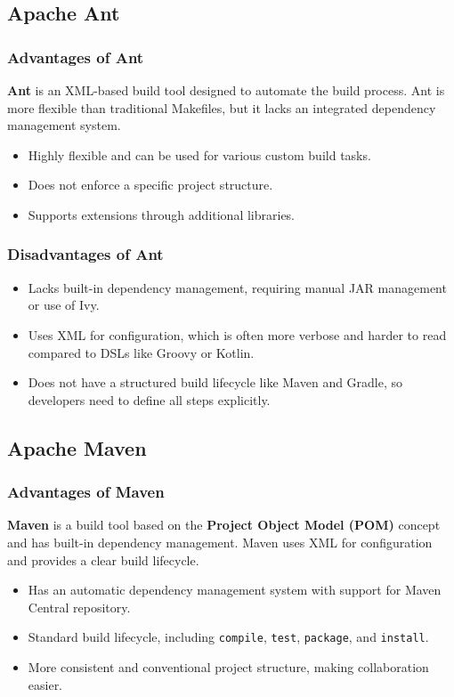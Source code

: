 \documentclass[aspectratio=169, table]{beamer}
\begin{document}
\subsection{Apache Ant}

\begin{frame}[fragile]
	\frametitle{Advantages of Ant}
	\textbf{Ant} is an XML-based build tool designed to automate the build process. Ant is more flexible than traditional Makefiles, but it lacks an integrated dependency management system.
	\begin{itemize}
		\item Highly flexible and can be used for various custom build tasks.
		\item Does not enforce a specific project structure.
		\item Supports extensions through additional libraries.
	\end{itemize}
\end{frame}

\begin{frame}[fragile]
	\frametitle{Disadvantages of Ant}
	\begin{itemize}
		\item Lacks built-in dependency management, requiring manual JAR management or use of Ivy.
		\item Uses XML for configuration, which is often more verbose and harder to read compared to DSLs like Groovy or Kotlin.
		\item Does not have a structured build lifecycle like Maven and Gradle, so developers need to define all steps explicitly.
	\end{itemize}
\end{frame}

\subsection{Apache Maven}
\begin{frame}[fragile]
	\frametitle{Advantages of Maven}
	\textbf{Maven} is a build tool based on the \textbf{Project Object Model (POM)} concept and has built-in dependency management. Maven uses XML for configuration and provides a clear build lifecycle.
	\begin{itemize}
		\item Has an automatic dependency management system with support for Maven Central repository.
		\item Standard build lifecycle, including \texttt{compile}, \texttt{test}, \texttt{package}, and \texttt{install}.
		\item More consistent and conventional project structure, making collaboration easier.
	\end{itemize}
\end{frame}
\end{document}
